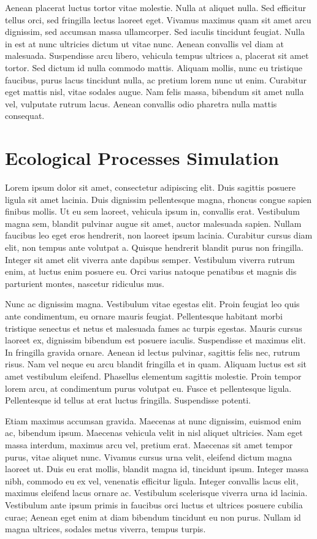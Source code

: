 \documentclass[
  letterpaper,
  DIV=11,
  numbers=noendperiod]{scrreprt}
\begin{document}
Aenean placerat luctus tortor vitae molestie. Nulla at aliquet nulla.
Sed efficitur tellus orci, sed fringilla lectus laoreet eget. Vivamus
maximus quam sit amet arcu dignissim, sed accumsan massa ullamcorper.
Sed iaculis tincidunt feugiat. Nulla in est at nunc ultricies dictum ut
vitae nunc. Aenean convallis vel diam at malesuada. Suspendisse arcu
libero, vehicula tempus ultrices a, placerat sit amet tortor. Sed dictum
id nulla commodo mattis. Aliquam mollis, nunc eu tristique faucibus,
purus lacus tincidunt nulla, ac pretium lorem nunc ut enim. Curabitur
eget mattis nisl, vitae sodales augue. Nam felis massa, bibendum sit
amet nulla vel, vulputate rutrum lacus. Aenean convallis odio pharetra
nulla mattis consequat.

\chapter{Ecological Processes
Simulation}\label{ecological-processes-simulation}

Lorem ipsum dolor sit amet, consectetur adipiscing elit. Duis sagittis
posuere ligula sit amet lacinia. Duis dignissim pellentesque magna,
rhoncus congue sapien finibus mollis. Ut eu sem laoreet, vehicula ipsum
in, convallis erat. Vestibulum magna sem, blandit pulvinar augue sit
amet, auctor malesuada sapien. Nullam faucibus leo eget eros hendrerit,
non laoreet ipsum lacinia. Curabitur cursus diam elit, non tempus ante
volutpat a. Quisque hendrerit blandit purus non fringilla. Integer sit
amet elit viverra ante dapibus semper. Vestibulum viverra rutrum enim,
at luctus enim posuere eu. Orci varius natoque penatibus et magnis dis
parturient montes, nascetur ridiculus mus.

Nunc ac dignissim magna. Vestibulum vitae egestas elit. Proin feugiat
leo quis ante condimentum, eu ornare mauris feugiat. Pellentesque
habitant morbi tristique senectus et netus et malesuada fames ac turpis
egestas. Mauris cursus laoreet ex, dignissim bibendum est posuere
iaculis. Suspendisse et maximus elit. In fringilla gravida ornare.
Aenean id lectus pulvinar, sagittis felis nec, rutrum risus. Nam vel
neque eu arcu blandit fringilla et in quam. Aliquam luctus est sit amet
vestibulum eleifend. Phasellus elementum sagittis molestie. Proin tempor
lorem arcu, at condimentum purus volutpat eu. Fusce et pellentesque
ligula. Pellentesque id tellus at erat luctus fringilla. Suspendisse
potenti.

Etiam maximus accumsan gravida. Maecenas at nunc dignissim, euismod enim
ac, bibendum ipsum. Maecenas vehicula velit in nisl aliquet ultricies.
Nam eget massa interdum, maximus arcu vel, pretium erat. Maecenas sit
amet tempor purus, vitae aliquet nunc. Vivamus cursus urna velit,
eleifend dictum magna laoreet ut. Duis eu erat mollis, blandit magna id,
tincidunt ipsum. Integer massa nibh, commodo eu ex vel, venenatis
efficitur ligula. Integer convallis lacus elit, maximus eleifend lacus
ornare ac. Vestibulum scelerisque viverra urna id lacinia. Vestibulum
ante ipsum primis in faucibus orci luctus et ultrices posuere cubilia
curae; Aenean eget enim at diam bibendum tincidunt eu non purus. Nullam
id magna ultrices, sodales metus viverra, tempus turpis.
\end{document}
